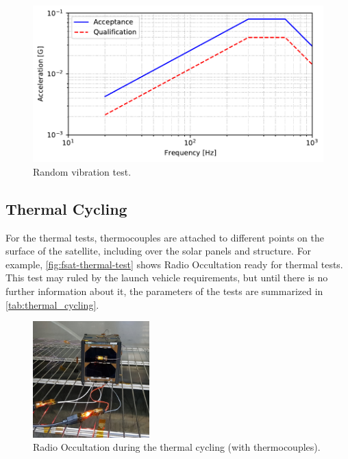 \begin{figure}[!htb]
    \begin{center}
        \includegraphics[width=\textwidth]{curves/random_vibration.pdf}
        \caption{Random vibration test.}
        \label{fig:vibration-random}
    \end{center}
\end{figure}

\subsection{Thermal Cycling}

For the thermal tests, thermocouples are attached to different points on the surface of the satellite, including over the solar panels and structure. For example, \autoref{fig:fsat-thermal-test} shows Radio Occultation ready for thermal tests. This test may ruled by the launch vehicle requirements, but until there is no further information about it, the parameters of the tests are summarized in \autoref{tab:thermal_cycling}.

\begin{figure}[!htb]
    \begin{center}
        \includegraphics[width=0.4\textwidth]{figures/fsat_fm_thermal_cycling.jpg}
        \caption{Radio Occultation during the thermal cycling (with thermocouples).}
        \label{fig:fsat-thermal-test}
    \end{center}
\end{figure}

